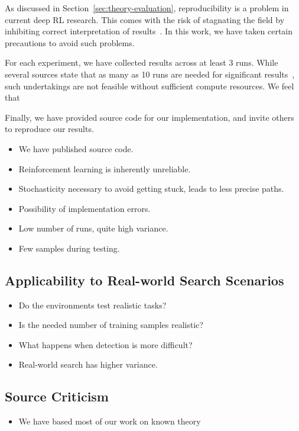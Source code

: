 As discussed in Section~\ref{sec:theory-evaluation}, reproducibility is a problem in current deep RL research.
This comes with the risk of stagnating the field by inhibiting correct interpretation of results~\cite{henderson_matters_2018}.
In this work, we have taken certain precautions to avoid such problems.

For each experiment, we have collected results across at least 3 runs.
While several sources state that as many as 10 runs are needed for significant results~\cite{colas_hitchhiker_2019,agarwal_rlliable_2022},
such undertakings are not feasible without sufficient compute resources.
We feel that 

Finally, we have provided source code for our implementation, and invite others to reproduce our results.

\begin{itemize}
    \item We have published source code.
    \item Reinforcement learning is inherently unreliable.
    \item Stochasticity necessary to avoid getting stuck, leads to less precise paths.
    \item Possibility of implementation errors.
    \item Low number of runs, quite high variance.
    \item Few samples during testing.
\end{itemize}

\subsection{Applicability to Real-world Search Scenarios}

\begin{itemize}
    \item Do the environments test realistic tasks?
    \item Is the needed number of training samples realistic?
    \item What happens when detection is more difficult?
    \item Real-world search has higher variance.
\end{itemize}


\subsection{Source Criticism}

\begin{itemize}
    \item We have based most of our work on known theory
\end{itemize}



